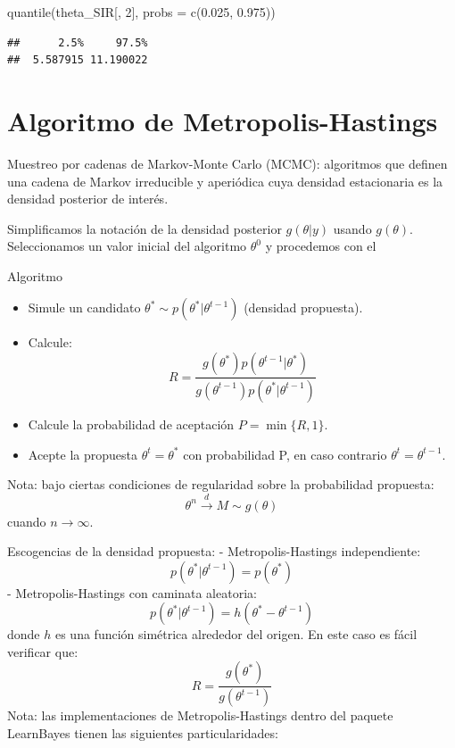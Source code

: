 \documentclass[
  12pt,
]{book}
\newenvironment{Shaded}{\begin{snugshade}}{\end{snugshade}}
\newcommand{\AttributeTok}[1]{\textcolor[rgb]{0.77,0.63,0.00}{#1}}
\newcommand{\DecValTok}[1]{\textcolor[rgb]{0.00,0.00,0.81}{#1}}
\newcommand{\FloatTok}[1]{\textcolor[rgb]{0.00,0.00,0.81}{#1}}
\newcommand{\FunctionTok}[1]{\textcolor[rgb]{0.00,0.00,0.00}{#1}}
\newcommand{\NormalTok}[1]{#1}
\providecommand{\tightlist}{%
  \setlength{\itemsep}{0pt}\setlength{\parskip}{0pt}}
\theoremstyle{definition}
\theoremstyle{definition}
\theoremstyle{definition}
\theoremstyle{definition}
\theoremstyle{remark}
\begin{document}
\begin{Shaded}
\begin{Highlighting}[]
\FunctionTok{quantile}\NormalTok{(theta\_SIR[, }\DecValTok{2}\NormalTok{], }\AttributeTok{probs =} \FunctionTok{c}\NormalTok{(}\FloatTok{0.025}\NormalTok{, }\FloatTok{0.975}\NormalTok{))}
\end{Highlighting}
\end{Shaded}

\begin{verbatim}
##      2.5%     97.5% 
##  5.587915 11.190022
\end{verbatim}

\hypertarget{algoritmo-de-metropolis-hastings}{%
\section{Algoritmo de Metropolis-Hastings}\label{algoritmo-de-metropolis-hastings}}

Muestreo por cadenas de Markov-Monte Carlo (MCMC): algoritmos que definen una cadena de Markov irreducible y aperiódica cuya densidad estacionaria es la densidad posterior de interés.

Simplificamos la notación de la densidad posterior \(g(\theta|y)\) usando \(g(\theta)\). Seleccionamos un valor inicial del algoritmo \(\theta^0\) y procedemos con el

Algoritmo

\begin{itemize}
\tightlist
\item
  Simule un candidato \(\theta^*\sim p(\theta^*|\theta^{t-1})\) (densidad propuesta).
\item
  Calcule:
  \[R=\frac{g(\theta^*)p(\theta^{t-1}|\theta^*)}{g(\theta^{t-1})p(\theta^*|\theta^{t-1})}\]
\item
  Calcule la probabilidad de aceptación \(P=\min \{R,1\}\).
\item
  Acepte la propuesta \(\theta^{t}=\theta^*\) con probabilidad P, en caso contrario \(\theta^t=\theta^{t-1}\).
\end{itemize}

Nota: bajo ciertas condiciones de regularidad sobre la probabilidad propuesta:
\[\theta^n \stackrel{d}{\longrightarrow} M\sim g(\theta)\]
cuando \(n\rightarrow \infty\).

Escogencias de la densidad propuesta:
- Metropolis-Hastings independiente:
\[p(\theta^*|\theta^{t-1})=p(\theta^*)\]
- Metropolis-Hastings con caminata aleatoria:
\[p(\theta^*|\theta^{t-1})=h(\theta^*-\theta^{t-1})\]
donde \(h\) es una función simétrica alrededor del origen. En este caso es fácil verificar que:
\[R=\frac{g(\theta^*)}{g(\theta^{t-1})}\]
Nota: las implementaciones de Metropolis-Hastings dentro del paquete LearnBayes tienen las siguientes particularidades:
\end{document}
